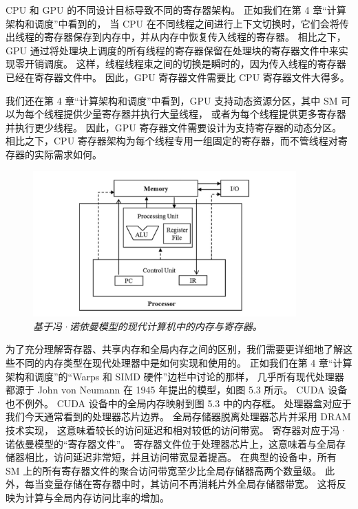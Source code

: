\begin{remark}
CPU 和 GPU 的不同设计目标导致不同的寄存器架构。 正如我们在第 4 章“计算架构和调度”中看到的，
当 CPU 在不同线程之间进行上下文切换时，它们会将传出线程的寄存器保存到内存中，并从内存中恢复传入线程的寄存器。 
相比之下，GPU 通过将处理块上调度的所有线程的寄存器保留在处理块的寄存器文件中来实现零开销调度。 
这样，线程线程束之间的切换是瞬时的，因为传入线程的寄存器已经在寄存器文件中。 
因此，GPU 寄存器文件需要比 CPU 寄存器文件大得多。

我们还在第 4 章“计算架构和调度”中看到，GPU 支持动态资源分区，其中 SM 可以为每个线程提供少量寄存器并执行大量线程，
或者为每个线程提供更多寄存器并执行更少线程。 因此，GPU 寄存器文件需要设计为支持寄存器的动态分区。 
相比之下，CPU 寄存器架构为每个线程专用一组固定的寄存器，而不管线程对寄存器的实际需求如何。
\end{remark}

\begin{figure}[H]
	\centering
	\includegraphics[width=0.9\textwidth]{figs/F5.3.png}
	\caption{\textit{基于冯·诺依曼模型的现代计算机中的内存与寄存器。}}
\end{figure}

为了充分理解寄存器、共享内存和全局内存之间的区别，我们需要更详细地了解这些不同的内存类型在现代处理器中是如何实现和使用的。 
正如我们在第 4 章“计算架构和调度”的“Warps 和 SIMD 硬件”边栏中讨论的那样，
几乎所有现代处理器都源于 John von Neumann 在 1945 年提出的模型，如图 5.3 所示。 
CUDA 设备也不例外。 CUDA 设备中的全局内存映射到图 5.3 中的内存框。 
处理器盒对应于我们今天通常看到的处理器芯片边界。 全局存储器脱离处理器芯片并采用 DRAM 技术实现，
这意味着较长的访问延迟和相对较低的访问带宽。 寄存器对应于冯·诺依曼模型的“寄存器文件”。 
寄存器文件位于处理器芯片上，这意味着与全局存储器相比，访问延迟非常短，并且访问带宽显着提高。 
在典型的设备中，所有 SM 上的所有寄存器文件的聚合访问带宽至少比全局存储器高两个数量级。 
此外，每当变量存储在寄存器中时，其访问不再消耗片外全局存储器带宽。 这将反映为计算与全局内存访问比率的增加。

